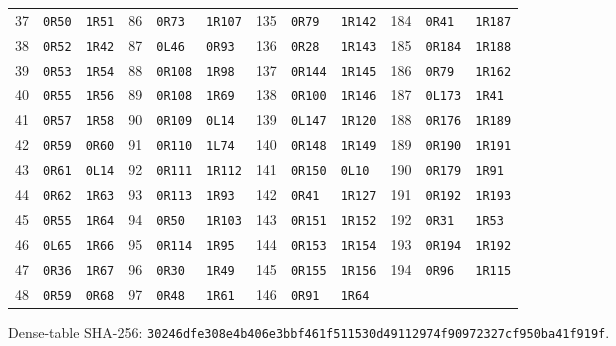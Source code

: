 \begin{center}
\begin{tabular}{@{}rll@{\hspace{4mm}}rll@{\hspace{4mm}}rll@{\hspace{4mm}}rll@{}}
37 & \texttt{0R50} & \texttt{1R51} & 86 & \texttt{0R73} & \texttt{1R107} & 135 & \texttt{0R79} & \texttt{1R142} & 184 & \texttt{0R41} & \texttt{1R187}\\
38 & \texttt{0R52} & \texttt{1R42} & 87 & \texttt{0L46} & \texttt{0R93} & 136 & \texttt{0R28} & \texttt{1R143} & 185 & \texttt{0R184} & \texttt{1R188}\\
39 & \texttt{0R53} & \texttt{1R54} & 88 & \texttt{0R108} & \texttt{1R98} & 137 & \texttt{0R144} & \texttt{1R145} & 186 & \texttt{0R79} & \texttt{1R162}\\
40 & \texttt{0R55} & \texttt{1R56} & 89 & \texttt{0R108} & \texttt{1R69} & 138 & \texttt{0R100} & \texttt{1R146} & 187 & \texttt{0L173} & \texttt{1R41}\\
41 & \texttt{0R57} & \texttt{1R58} & 90 & \texttt{0R109} & \texttt{0L14} & 139 & \texttt{0L147} & \texttt{1R120} & 188 & \texttt{0R176} & \texttt{1R189}\\
42 & \texttt{0R59} & \texttt{0R60} & 91 & \texttt{0R110} & \texttt{1L74} & 140 & \texttt{0R148} & \texttt{1R149} & 189 & \texttt{0R190} & \texttt{1R191}\\
43 & \texttt{0R61} & \texttt{0L14} & 92 & \texttt{0R111} & \texttt{1R112} & 141 & \texttt{0R150} & \texttt{0L10} & 190 & \texttt{0R179} & \texttt{1R91}\\
44 & \texttt{0R62} & \texttt{1R63} & 93 & \texttt{0R113} & \texttt{1R93} & 142 & \texttt{0R41} & \texttt{1R127} & 191 & \texttt{0R192} & \texttt{1R193}\\
45 & \texttt{0R55} & \texttt{1R64} & 94 & \texttt{0R50} & \texttt{1R103} & 143 & \texttt{0R151} & \texttt{1R152} & 192 & \texttt{0R31} & \texttt{1R53}\\
46 & \texttt{0L65} & \texttt{1R66} & 95 & \texttt{0R114} & \texttt{1R95} & 144 & \texttt{0R153} & \texttt{1R154} & 193 & \texttt{0R194} & \texttt{1R192}\\
47 & \texttt{0R36} & \texttt{1R67} & 96 & \texttt{0R30} & \texttt{1R49} & 145 & \texttt{0R155} & \texttt{1R156} & 194 & \texttt{0R96} & \texttt{1R115}\\
48 & \texttt{0R59} & \texttt{0R68} & 97 & \texttt{0R48} & \texttt{1R61} & 146 & \texttt{0R91} & \texttt{1R64} &  &  & \\
\bottomrule
\end{tabular}
\end{center}
\small Dense-table SHA-256: \nolinkurl{30246dfe308e4b406e3bbf461f511530d49112974f90972327cf950ba41f919f}.
